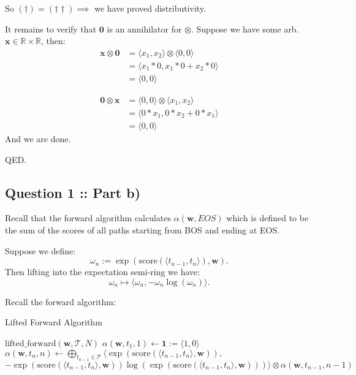 \documentclass[a4paper]{article}
\begin{document}
So $(\dag) = (\dag\dag) \implies$ we have proved distributivity.

It remains to verify that $\bm{0}$ is an annihilator for $\otimes$.
Suppose we have some arb. $\bm{x} \in \mathbb{R}\times\mathbb{R}$,
then:
\begin{align*}
     \bm{x} \otimes \bm{0} &=  \langle x_1, x_2 \rangle \otimes \langle 0, 0 \rangle\\ 
 &=  \langle x_1*0, x_1*0 + x_2*0 \rangle\\ 
 &=  \langle 0, 0 \rangle
\end{align*}

\begin{align*}
     \bm{0} \otimes \bm{x} &=  \langle 0, 0 \rangle \otimes \langle x_1, x_2 \rangle\\ 
    &=  \langle 0*x_1, 0*x_2 + 0*x_1 \rangle\\ 
    &=  \langle 0, 0 \rangle
\end{align*}
And we are done.

QED.

\subsection*{Question 1 :: Part b)}
Recall that the forward algorithm calculates $\alpha(\bm{w}, EOS)$ which is defined
to be the sum of the scores of all paths starting from BOS and ending at EOS.

Suppose we define:
\[
    \omega_n := \exp\left(\text{score}(\langle t_{n-1}, t_n \rangle), \bm{w}\right)
.\]
Then lifting into the expectation semi-ring we have:
\[
\omega_n \mapsto \langle \omega_n, -\omega_n \log\left(\omega_n\right) \rangle
.\]

Recall the forward algorithm:

\begin{algorithm}
\caption{Lifted Forward Algorithm}
\begin{algorithmic}
    \State  $\mathrm{lifted\_forward} (\bm{w}, \mathcal{T}, N)$
    \State $\alpha(\bm{w}, t_1, 1) \gets \bm{1} := \langle 1, 0 \rangle$
\EndFor
{}
        \State $\alpha(\bm{w}, t_n, n) \gets \bigoplus_{t_{n-1} \in \mathcal{T}} \langle \exp\left(\text{score}(\langle t_{n-1}, t_n \rangle, \bm{w})\right),$
        \State $-\exp\left(\text{score}(\langle t_{n-1}, t_n \rangle, \bm{w})\right) \log\left(\exp\left(\text{score}(\langle t_{n-1}, t_n \rangle, \bm{w})\right)\right)
        \rangle \otimes \alpha(\bm{w}, t_{n-1}, n-1)$
    \EndFor
\EndFor

\end{algorithmic}

\end{algorithm}
\end{document}
